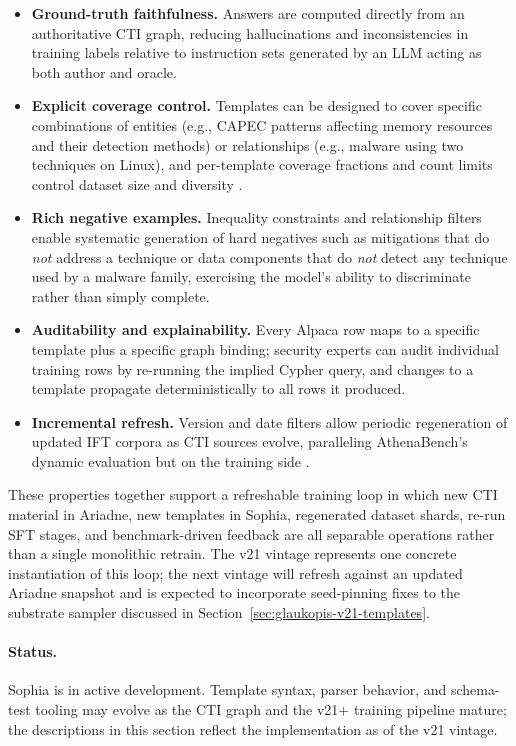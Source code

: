 \documentclass[unnumsec,webpdf,contemporary,large]{oup-authoring-template}
\theoremstyle{thmstyleone}
\theoremstyle{thmstyletwo}
\theoremstyle{thmstylethree}
\begin{document}
\begin{itemize}
  \item \textbf{Ground-truth faithfulness.} Answers are computed directly from an authoritative CTI graph, reducing hallucinations and inconsistencies in training labels relative to instruction sets generated by an LLM acting as both author and oracle.
  \item \textbf{Explicit coverage control.} Templates can be designed to cover specific combinations of entities (e.g., CAPEC patterns affecting memory resources and their detection methods) or relationships (e.g., malware using two techniques on Linux), and per-template coverage fractions and count limits control dataset size and diversity \cite{cardei2025ift}.
  \item \textbf{Rich negative examples.} Inequality constraints and relationship filters enable systematic generation of hard negatives such as mitigations that do \emph{not} address a technique or data components that do \emph{not} detect any technique used by a malware family, exercising the model's ability to discriminate rather than simply complete.
  \item \textbf{Auditability and explainability.} Every Alpaca row maps to a specific template plus a specific graph binding; security experts can audit individual training rows by re-running the implied Cypher query, and changes to a template propagate deterministically to all rows it produced.
  \item \textbf{Incremental refresh.} Version and date filters allow periodic regeneration of updated IFT corpora as CTI sources evolve, paralleling AthenaBench's dynamic evaluation but on the training side \cite{cardei2025ift,alam2025athenabench}.
\end{itemize}

These properties together support a refreshable training loop in which new CTI material in Ariadne, new templates in Sophia, regenerated dataset shards, re-run SFT stages, and benchmark-driven feedback are all separable operations rather than a single monolithic retrain. The v21 vintage represents one concrete instantiation of this loop; the next vintage will refresh against an updated Ariadne snapshot and is expected to incorporate seed-pinning fixes to the substrate sampler discussed in Section~\ref{sec:glaukopis-v21-templates}.

\paragraph{Status.}
Sophia is in active development. Template syntax, parser behavior, and schema-test tooling may evolve as the CTI graph and the v21+ training pipeline mature; the descriptions in this section reflect the implementation as of the v21 vintage.
\end{document}
